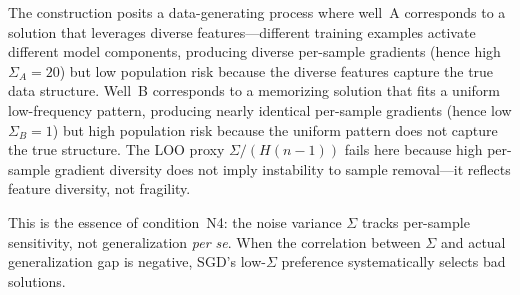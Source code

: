 \documentclass[11pt,a4paper]{article}
\begin{document}
The construction posits a data-generating process where well~A corresponds
to a solution that leverages diverse features---different training examples
activate different model components, producing diverse per-sample gradients
(hence high $\Sigma_A = 20$) but low population risk because the diverse
features capture the true data structure.  Well~B corresponds to a memorizing
solution that fits a uniform low-frequency pattern, producing nearly
identical per-sample gradients (hence low $\Sigma_B = 1$) but high
population risk because the uniform pattern does not capture the true
structure.  The LOO proxy $\Sigma/(H(n-1))$ fails here because high
per-sample gradient diversity does not imply instability to sample
removal---it reflects feature diversity, not fragility.

This is the essence of condition~N4: the noise variance $\Sigma$ tracks
per-sample sensitivity, not generalization \emph{per se}.  When the
correlation between $\Sigma$ and actual generalization gap is negative,
SGD's low-$\Sigma$ preference systematically selects bad solutions.
\end{document}
